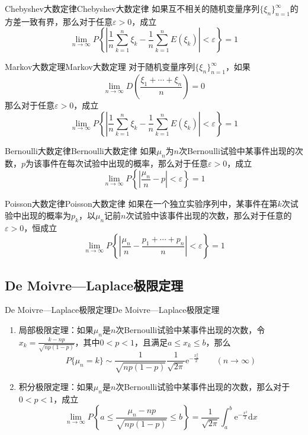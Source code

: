 \documentclass[lang = cn, scheme = chinese, thmcnt = section]{elegantbook}
\begin{document}
\begin{theorem}{Chebyshev大数定律}{Chebyshev大数定律}
	如果互不相关的随机变量序列$\{ \xi_n \}_{n=1}^{\infty}$的方差一致有界，那么对于任意$\varepsilon>0$，成立%
	$$
	\lim_{n\to\infty}P\left\{\left|\frac{1}{n}\sum_{k=1}^{n}{\xi_k}-\frac{1}{n}\sum_{k=1}^{n}{E(\xi_k)}\right|<\varepsilon\right\}=1
	$$
\end{theorem}

\begin{theorem}{Markov大数定理}{Markov大数定理}
	对于随机变量序列$\{ \xi_n \}_{n=1}^{\infty}$，如果
	$$
	\lim_{n\to\infty}D\left(\frac{\xi_1+\cdots+\xi_n}{n}\right)=0
	$$
	那么对于任意$\varepsilon>0$，成立%
	$$
	\lim_{n\to\infty}P\left\{\left|\frac{1}{n}\sum_{k=1}^{n}{\xi_k}-\frac{1}{n}\sum_{k=1}^{n}{E(\xi_k)}\right|<\varepsilon\right\}=1
	$$
\end{theorem}

\begin{theorem}{Bernoulli大数定律}{Bernoulli大数定律}
	如果$\mu_n$为$n$次Bernoulli试验中某事件出现的次数，$p$为该事件在每次试验中出现的概率，那么对于任意$\varepsilon>0$，成立
	$$
	\lim_{n\to\infty}P\left\{\left|\frac{\mu_n}{n}-p\right|<\varepsilon\right\}=1
	$$
\end{theorem}

\begin{theorem}{Poisson大数定律}{Poisson大数定律}
	如果在一个独立实验序列中，某事件在第$k$次试验中出现的概率为$p_k$，以$\mu_n$记前$n$次试验中该事件出现的次数，那么对于任意的$\varepsilon>0$，恒成立
	$$
	\lim_{n\to\infty}P\left\{\left|\frac{\mu_n}{n}-\frac{p_1+\cdots+p_n}{n}\right|<\varepsilon\right\}=1
	$$
\end{theorem}

\subsection{De Moivre—Laplace极限定理}

\begin{theorem}{De Moivre—Laplace极限定理}{De Moivre—Laplace极限定理}
	\begin{enumerate}
		\item 局部极限定理：如果$\mu_n$是$n$次Bernoulli试验中某事件出现的次数，令$x_k=\frac{k-np}{\sqrt{np(1-p)}}$，其中$0<p<1$，且满足$a\le x_k\le b$，那么
		$$
		P\{\mu_n=k\}\sim \frac{1}{\sqrt{np(1-p)}}\frac{1}{\sqrt{2\pi}}\mathrm{e}^{-\frac{x_k^2}{2}}\qquad(n\to\infty)
		$$
		\item 积分极限定理：如果$\mu_n$是$n$次Bernoulli试验中某事件出现的次数，那么对于$0<p<1$，成立
		$$
		\lim_{n\to\infty}P\left\{a\le\frac{\mu_n-np}{\sqrt{np(1-p)}}\le b\right\}=\frac{1}{\sqrt{2\pi}}\int_{a}^{b}{\mathrm{e}^{-\frac{x^2}{2}}\mathrm{d}x}
		$$
	\end{enumerate}
\end{theorem}
\end{document}
